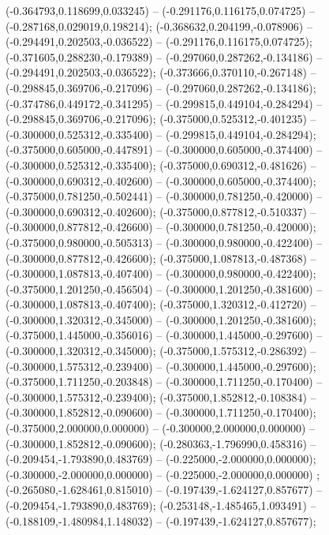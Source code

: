  (-0.364793,0.118699,0.033245) -- (-0.291176,0.116175,0.074725) -- (-0.287168,0.029019,0.198214);
 (-0.368632,0.204199,-0.078906) -- (-0.294491,0.202503,-0.036522) -- (-0.291176,0.116175,0.074725);
 (-0.371605,0.288230,-0.179389) -- (-0.297060,0.287262,-0.134186) -- (-0.294491,0.202503,-0.036522);
 (-0.373666,0.370110,-0.267148) -- (-0.298845,0.369706,-0.217096) -- (-0.297060,0.287262,-0.134186);
 (-0.374786,0.449172,-0.341295) -- (-0.299815,0.449104,-0.284294) -- (-0.298845,0.369706,-0.217096);
 (-0.375000,0.525312,-0.401235) -- (-0.300000,0.525312,-0.335400) -- (-0.299815,0.449104,-0.284294);
 (-0.375000,0.605000,-0.447891) -- (-0.300000,0.605000,-0.374400) -- (-0.300000,0.525312,-0.335400);
 (-0.375000,0.690312,-0.481626) -- (-0.300000,0.690312,-0.402600) -- (-0.300000,0.605000,-0.374400);
 (-0.375000,0.781250,-0.502441) -- (-0.300000,0.781250,-0.420000) -- (-0.300000,0.690312,-0.402600);
 (-0.375000,0.877812,-0.510337) -- (-0.300000,0.877812,-0.426600) -- (-0.300000,0.781250,-0.420000);
 (-0.375000,0.980000,-0.505313) -- (-0.300000,0.980000,-0.422400) -- (-0.300000,0.877812,-0.426600);
 (-0.375000,1.087813,-0.487368) -- (-0.300000,1.087813,-0.407400) -- (-0.300000,0.980000,-0.422400);
 (-0.375000,1.201250,-0.456504) -- (-0.300000,1.201250,-0.381600) -- (-0.300000,1.087813,-0.407400);
 (-0.375000,1.320312,-0.412720) -- (-0.300000,1.320312,-0.345000) -- (-0.300000,1.201250,-0.381600);
 (-0.375000,1.445000,-0.356016) -- (-0.300000,1.445000,-0.297600) -- (-0.300000,1.320312,-0.345000);
 (-0.375000,1.575312,-0.286392) -- (-0.300000,1.575312,-0.239400) -- (-0.300000,1.445000,-0.297600);
 (-0.375000,1.711250,-0.203848) -- (-0.300000,1.711250,-0.170400) -- (-0.300000,1.575312,-0.239400);
 (-0.375000,1.852812,-0.108384) -- (-0.300000,1.852812,-0.090600) -- (-0.300000,1.711250,-0.170400);
 (-0.375000,2.000000,0.000000) -- (-0.300000,2.000000,0.000000) -- (-0.300000,1.852812,-0.090600);
 (-0.280363,-1.796990,0.458316) -- (-0.209454,-1.793890,0.483769) -- (-0.225000,-2.000000,0.000000);
 (-0.300000,-2.000000,0.000000) -- (-0.225000,-2.000000,0.000000) ;
 (-0.265080,-1.628461,0.815010) -- (-0.197439,-1.624127,0.857677) -- (-0.209454,-1.793890,0.483769);
 (-0.253148,-1.485465,1.093491) -- (-0.188109,-1.480984,1.148032) -- (-0.197439,-1.624127,0.857677);
